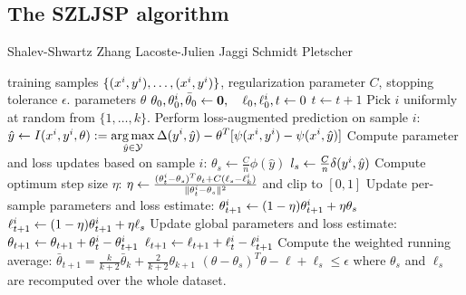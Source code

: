  
\subsection{The SZLJSP algorithm}
\begin{algorithm*}[t]
    \caption{Shalev-Shwartz Zhang Lacoste-Julien Jaggi Schmidt Pletscher\label{alg_szljsp}}
    \begin{doublespacing}
    \begin{algorithmic}[1]
        \Require training samples $\{ (x^{i}, y^{i}), \dots, (x^{i}, y^{i})\}$, regularization parameter $C$, stopping tolerance $\epsilon$.
        \Ensure parameters $\theta$
        \State $\theta_0, \theta_0^{i}, \bar{\theta}_0  \leftarrow \mathbf{0},\quad \ell_0, \ell_0^{i}, t \leftarrow 0 $
        \Repeat
            \State $t \leftarrow t + 1$
            \State Pick $i$ uniformly at random from $\{1, \dotsc, k\}$.
            \State Perform loss-augmented prediction on sample $i$:
            \Statex[2]   $\hat{y} \leftarrow I(x^{i}, y^{i}, \theta) := \displaystyle \operatorname*{arg\,max}_{\hat{y}\in\mathcal{Y}} \Delta(y^{i}, \hat{y}) - \theta^T [\psi(x^{i}, y^{i}) - \psi(x^{i}, \hat{y})]$
            \State Compute parameter and loss updates based on sample $i$:
            \Statex[2]     $\theta_s \leftarrow \frac{C}{n} \phi(\hat{y})$
            \Statex[2]     $l_s \leftarrow \frac{C}{n} \delta(y^{i}, \hat{y})$
            \State Compute optimum step size $\eta$:
            \Statex[2]    $\eta \leftarrow \frac{(\theta_t^{i} - \theta_s)^T \theta_t + C (\ell_s - \ell_k^{i} )}{\lVert \theta_t^{i} - \theta_s \rVert^2}$ and clip to $[0, 1]$
            \State Update per-sample parameters and loss estimate:
            \Statex[2]    $\theta_{t+1}^{i} \leftarrow (1 - \eta) \theta_{t+1}^{i} + \eta \theta_s$
            \Statex[2]    $\ell_{t+1}^{i} \leftarrow (1 - \eta) \theta_{t+1}^{i} + \eta \ell_s$
            \State Update global parameters and loss estimate:
            \Statex[2]   $\theta_{t+1} \leftarrow \theta_{t+1} + \theta_{t}^{i} - \theta_{t+1}^{i}$
            \Statex[2]   $\ell_{t+1} \leftarrow \ell_{t+1} + \ell_{t}^{i} - \ell_{t+1}^{i}$
            \State Compute the weighted running average:
            \Statex[2] $\bar{\theta}_{t+1} = \frac{k}{k + 2} \bar{\theta}_k + \frac{2}{k + 2}\theta_{k+1}$
        \Until $(\theta - \theta_s)^T\theta - \ell + \ell_s \leq \epsilon$
        \Statex where $\theta_s$ and $\ell_s$ are recomputed over the whole dataset.
    \end{algorithmic}
    \end{doublespacing}
\end{algorithm*}

